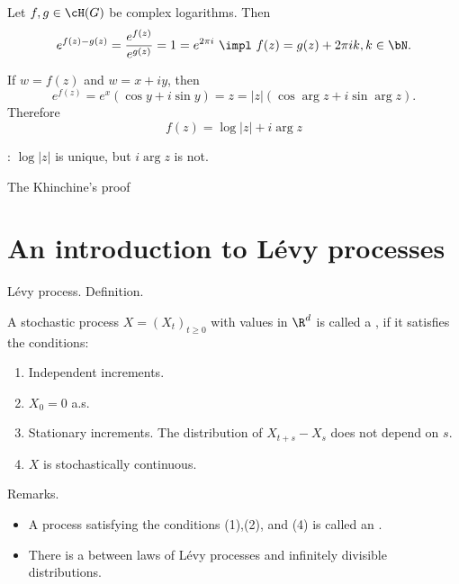 \begin{frame}
    Let $f,g \in \cH(G)$ be complex logarithms. Then
    \begin{equation*}
        e^{f(z)-g(z)} = \frac{e^{f(z)}}{e^{g(z)}} = 1 = e^{2\pi i} 
        \ \impl\  f(z) = g(z) +2\pi ik, k\in\bN.
    \end{equation*}

    If $w=f(z)$ and $w=x+iy$, then 
    \begin{equation*}
        e^{f(z)} = e^{x}\left( \cos y +i\sin y \right) = 
        z = |z| \left( \cos\arg z + i \sin\arg z \right). 
    \end{equation*}
    Therefore
    \begin{equation*}
        f(z) = \log |z| + i \arg z
    \end{equation*}

    : $\log |z|$ is unique, but $i\arg z$ is not.
\end{frame}



\begin{frame}
    {The Khinchine's proof }
    
\end{frame}






\section{An introduction to L\'evy processes}

\begin{frame}
    {L\'evy process. Definition.}
    
    A stochastic process $X = \left( X_t \right)_{t\geq 0}$ with values
    in $\R^d$ is called a , if it satisfies the conditions:
    \begin{enumerate}
        \item Independent increments. 
        \item $X_0 = 0$ a.s.
        \item Stationary increments. The distribution of $X_{t+s}-X_s$ does
            not depend on $s$. 
        \item $X$ is stochastically continuous.
    \end{enumerate}

    Remarks.
    \begin{itemize}
        \item A process satisfying the conditions (1),(2), and (4) is
            called an . 
        \item There is a  between laws of L\'evy processes and
            infinitely divisible distributions.
    \end{itemize}
\end{frame}


